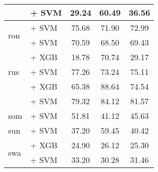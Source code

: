 \begin{longtable}{llccc}
                                       & \citep{sturua2024jinaembeddingsv3multilingualembeddingstask} + SVM & 29.24                                & 60.49              & 36.56             \\
    \midrule
    \multirow{2}{*}{ron}               & \citep{wang2024multilingual} + SVM                                 & 75.68                                & 71.90              & 72.99             \\
                                       & \citep{sturua2024jinaembeddingsv3multilingualembeddingstask} + SVM & 70.59                                & 68.50              & 69.43             \\
    \midrule
    \multirow{3}{*}{rus}               & \citep{all-MiniLM-L12-v2} + XGB                                    & 18.78                                & 70.74              & 29.17             \\
                                       & \citep{wang2024multilingual} + SVM                                 & 77.26                                & 73.24              & 75.11             \\
                                       & \citep{snegirev2025russianfocusedembeddersexplorationrumteb} + XGB & 65.38                                & 88.64              & 74.54             \\
                                       & \citep{snegirev2025russianfocusedembeddersexplorationrumteb} + SVM & 79.32                                & 84.12              & 81.57             \\
    \midrule
    som                                & \citep{wang2024multilingual} + SVM                                 & 51.81                                & 41.12              & 45.63             \\
    \midrule
    sun                                & \citep{wang2024multilingual} + SVM                                 & 37.20                                & 59.45              & 40.42             \\
    \midrule
    \multirow{2}{*}{swa}               & \citep{wang2023improving} + XGB                                    & 24.90                                & 26.12              & 25.30             \\
                                       & \citep{wang2024multilingual} + SVM                                 & 33.20                                & 30.28              & 31.46             \\

\end{longtable}
